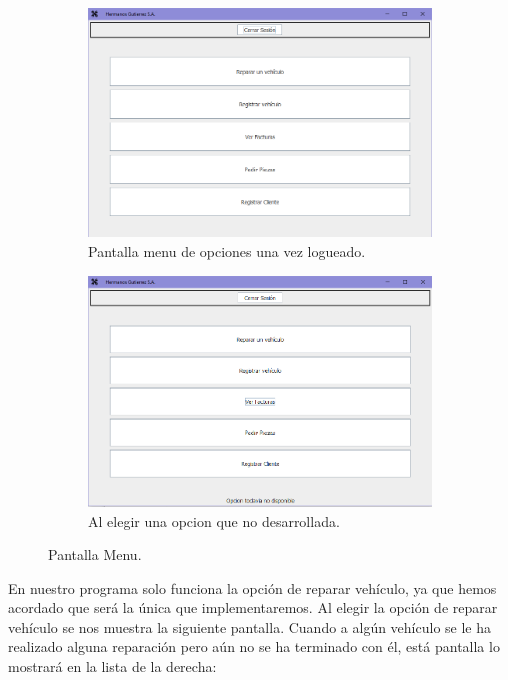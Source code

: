 \documentclass{article}
\begin{document}
    \begin{figure}[H]
      \centering
      \begin{subfigure}{.5\textwidth}
        \centering
        \includegraphics[width=0.9\linewidth]{program/capturasEjec/menu.PNG}
        \caption{Pantalla menu de opciones una vez logueado.}
      \end{subfigure}%
      \begin{subfigure}{.5\textwidth}
        \centering
        \includegraphics[width=0.9\linewidth]{program/capturasEjec/menuNoOption.PNG}
        \caption{Al elegir una opcion que no desarrollada.}
      \end{subfigure}
      \caption{Pantalla Menu.}
    \end{figure}
  En nuestro programa solo funciona la opción de reparar vehículo, ya que hemos acordado que será la única que implementaremos. Al elegir la opción de reparar vehículo se nos muestra la siguiente pantalla. 
  Cuando a algún vehículo se le ha realizado alguna reparación pero aún no se ha terminado con él, está pantalla lo mostrará en la lista de la derecha:\\
\end{document}
